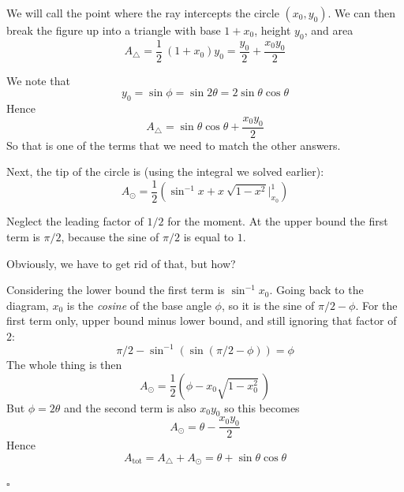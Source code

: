 \documentclass[11pt, oneside]{article}
\begin{document}
We will call the point where the ray intercepts the circle $(x_0,y_0)$.  We can then break the figure up into a triangle with base $1 + x_0$, height $y_0$, and area
\[ A_{\triangle} = \frac{1}{2} \ (1 + x_0) y_0 = \frac{y_0}{2} + \frac{x_0 y_0}{2} \]

We note that 
\[ y_0 = \sin \phi = \sin 2 \theta = 2 \sin \theta \cos \theta \]
Hence
\[ A_{\triangle} = \sin \theta \cos \theta + \frac{x_0 y_0}{2} \]
So that is one of the terms that we need to match the other answers.  

Next, the tip of the circle is (using the integral we solved earlier):
\[ A_{\odot} = \frac{1}{2} (\sin^{-1} x + x \ \sqrt{1 - x^2} \bigg |_{x_0}^1 ) \]

Neglect the leading factor of $1/2$ for the moment.  At the upper bound the first term is $\pi/2$, because the sine of $\pi/2$ is equal to $1$.  

Obviously, we have to get rid of that, but how?

Considering the lower bound the first term is $\sin^{-1} x_0$.  Going back to the diagram, $x_0$ is the \emph{cosine} of the base angle $\phi$, so it is the sine of $\pi/2 - \phi$.  For the first term only, upper bound minus lower bound, and still ignoring that factor of $2$:
\[ \pi/2 - \sin^{-1} ( \sin (\pi/2 - \phi)) = \phi \]
The whole thing is then
\[ A_{\odot} = \frac{1}{2} (\phi - x_0 \sqrt{1 - x_0^2} \ ) \]
But $\phi = 2 \theta$ and the second term is also $x_0 y_0$ so this becomes
\[ A_{\odot} = \theta - \frac{x_0 y_0}{2} \]
Hence
\[ A_{\text{tot}} = A_{\triangle} + A_{\odot} = \theta + \sin \theta \cos \theta \]

$\square$
\end{document}
